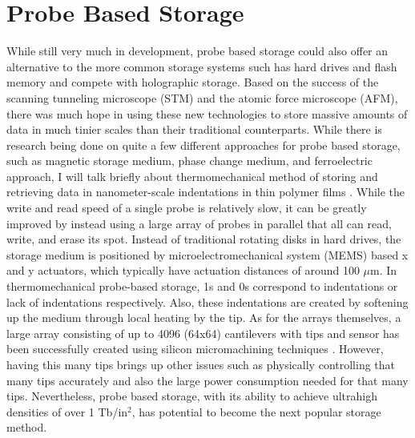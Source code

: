 \documentclass[ notitlepage, numerical, 11pt]{revtex4-1} %
\begin{document}
\section{Probe Based Storage}

While still very much in development, probe based storage could also offer an alternative to the more common storage systems such has hard drives and flash memory and compete with holographic storage. Based on the success of the scanning tunneling microscope (STM) and the atomic force microscope (AFM), there was much hope in using these new technologies to store massive amounts of data in much tinier scales than their traditional counterparts. While there is research being done on quite a few different approaches for probe based storage, such as magnetic storage medium, phase change medium, and ferroelectric approach, I will talk briefly about thermomechanical method of storing and retrieving data in nanometer-scale indentations in thin polymer films \cite{probe}.  While the write and read speed of a single probe is relatively slow, it can be greatly improved by instead using a large array of probes in parallel that all can read, write, and erase its spot. Instead of traditional rotating disks in hard drives, the storage medium is positioned by microelectromechanical system (MEMS) based x and y actuators, which typically have actuation distances of around 100 $\mu$m. In thermomechanical probe-based storage, 1s and 0s correspond to indentations or lack of indentations respectively. Also, these indentations are created by softening up the medium through local heating by the tip. As for the arrays themselves, a large array consisting of up to 4096 (64x64) cantilevers with tips and sensor has been successfully created using silicon micromachining techniques \cite{probe}.  However, having this many tips brings up other issues such as physically controlling that many tips accurately and also the large power consumption needed for that many tips. Nevertheless, probe based storage, with its ability to achieve ultrahigh densities of over 1 Tb/in$^2$, has potential to become the next popular storage method.
\end{document}
